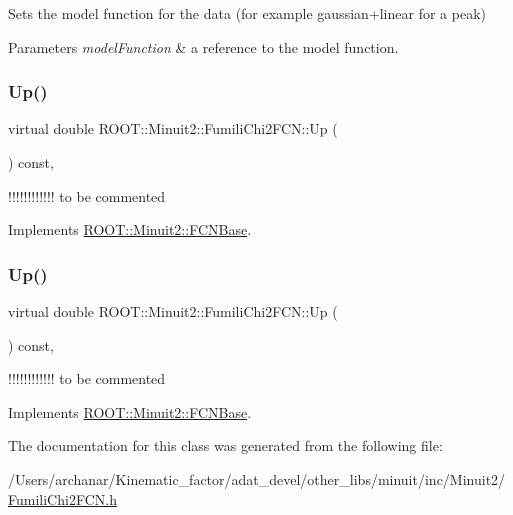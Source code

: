 Sets the model function for the data (for example gaussian+linear for a peak)


\begin{DoxyParams}{Parameters}
{\em model\+Function} & a reference to the model function. \\
\hline
\end{DoxyParams}
\mbox{\label{classROOT_1_1Minuit2_1_1FumiliChi2FCN_a7e68bc2b2eb631ec52b753d7d49c4414}} 
\subsubsection{\texorpdfstring{Up()}{Up()}\hspace{0.1cm}{\footnotesize\ttfamily [1/2]}}
{\footnotesize\ttfamily virtual double R\+O\+O\+T\+::\+Minuit2\+::\+Fumili\+Chi2\+F\+C\+N\+::\+Up (\begin{DoxyParamCaption}{ }\end{DoxyParamCaption}) const\hspace{0.3cm}{\ttfamily [inline]}, {\ttfamily [virtual]}}

!!!!!!!!!!!! to be commented 

Implements \mbox{\hyperlink{classROOT_1_1Minuit2_1_1FCNBase_a04ef08ddad92ce8d89d498efbe021c39}{R\+O\+O\+T\+::\+Minuit2\+::\+F\+C\+N\+Base}}.

\mbox{\label{classROOT_1_1Minuit2_1_1FumiliChi2FCN_a7e68bc2b2eb631ec52b753d7d49c4414}} 
\subsubsection{\texorpdfstring{Up()}{Up()}\hspace{0.1cm}{\footnotesize\ttfamily [2/2]}}
{\footnotesize\ttfamily virtual double R\+O\+O\+T\+::\+Minuit2\+::\+Fumili\+Chi2\+F\+C\+N\+::\+Up (\begin{DoxyParamCaption}{ }\end{DoxyParamCaption}) const\hspace{0.3cm}{\ttfamily [inline]}, {\ttfamily [virtual]}}

!!!!!!!!!!!! to be commented 

Implements \mbox{\hyperlink{classROOT_1_1Minuit2_1_1FCNBase_a04ef08ddad92ce8d89d498efbe021c39}{R\+O\+O\+T\+::\+Minuit2\+::\+F\+C\+N\+Base}}.



The documentation for this class was generated from the following file\+:\begin{DoxyCompactItemize}
\item 
/\+Users/archanar/\+Kinematic\+\_\+factor/adat\+\_\+devel/other\+\_\+libs/minuit/inc/\+Minuit2/\mbox{\hyperlink{other__libs_2minuit_2inc_2Minuit2_2FumiliChi2FCN_8h}{Fumili\+Chi2\+F\+C\+N.\+h}}\end{DoxyCompactItemize}
